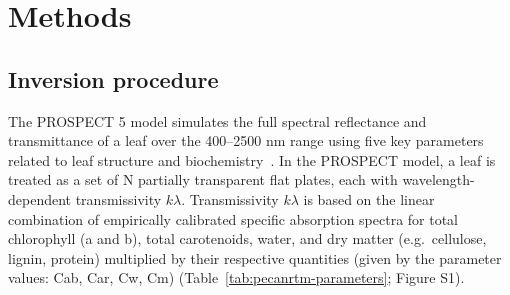 \section{Methods}\label{sec:pecanrtm-methods}

\subsection{Inversion procedure}

The PROSPECT 5 model simulates the full spectral reflectance and transmittance of a leaf over the 400--2500 nm range using five key parameters related to leaf structure and biochemistry~\cite{feret_2008_prospect}.
In the PROSPECT model, a leaf is treated as a set of N partially transparent flat plates, each with wavelength-dependent transmissivity $k\lambda$.
Transmissivity $k\lambda$ is based on the linear combination of empirically calibrated specific absorption spectra for total chlorophyll (a and b), total carotenoids, water, and dry matter (e.g.\ cellulose, lignin, protein) multiplied by their respective quantities (given by the parameter values: Cab, Car, Cw, Cm) (Table~\ref{tab:pecanrtm-parameters}; Figure S1). %

\begin{table}
  \caption{%
    Summary of PROSPECT 5 parameters.
    Ranges for Car, Cw, and Cm are based on the datasets used for their calibration (ANGERS for Cab and Car, LOPEX for Cw and Cm) as reported in Feret et al.~(2008).
    The ranges for N and Cab are calculated from the LOPEX and ANGERS databases, respectively.
    Units for Cw and Cm are adjusted for readability (original units are $g cm^{−2}$).
  }\label{tab:pecanrtm-parameters}
\end{table}

